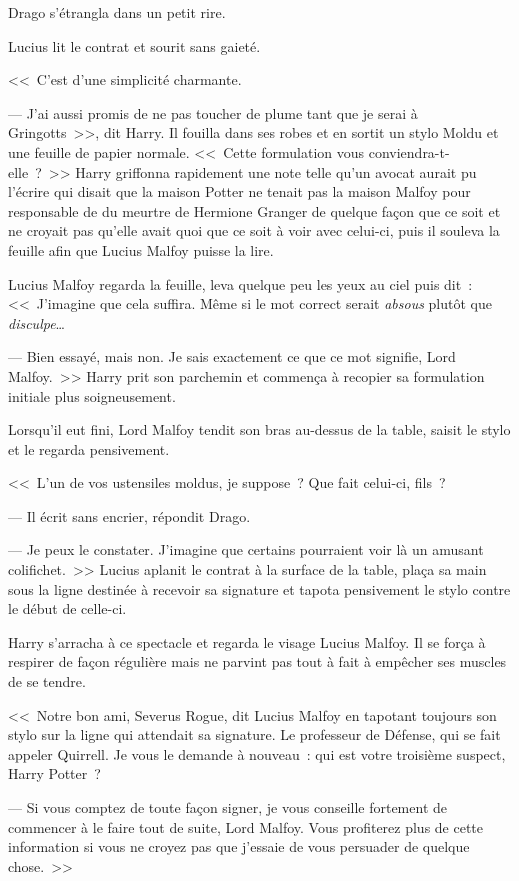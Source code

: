 Drago s'étrangla dans un petit rire.

Lucius lit le contrat et sourit sans gaieté.

<<~C'est d'une simplicité charmante.

--- J'ai aussi promis de ne pas toucher de plume tant que je serai à Gringotts~>>, dit Harry. Il fouilla dans ses robes et en sortit un stylo Moldu et une feuille de papier normale. <<~Cette formulation vous conviendra-t-elle~?~>> Harry griffonna rapidement une note telle qu'un avocat aurait pu l'écrire qui disait que la maison Potter ne tenait pas la maison Malfoy pour responsable de du meurtre de Hermione Granger de quelque façon que ce soit et ne croyait pas qu'elle avait quoi que ce soit à voir avec celui-ci, puis il souleva la feuille afin que Lucius Malfoy puisse la lire.

Lucius Malfoy regarda la feuille, leva quelque peu les yeux au ciel puis dit~:
<<~J'imagine que cela suffira. Même si le mot correct serait \emph{absous} plutôt que \emph{disculpe}…

--- Bien essayé, mais non. Je sais exactement ce que ce mot signifie, Lord Malfoy.~>> Harry prit son parchemin et commença à recopier sa formulation initiale plus soigneusement.

Lorsqu'il eut fini, Lord Malfoy tendit son bras au-dessus de la table, saisit le stylo et le regarda pensivement.

<<~L'un de vos ustensiles moldus, je suppose~? Que fait celui-ci, fils~?

--- Il écrit sans encrier, répondit Drago.

--- Je peux le constater. J'imagine que certains pourraient voir là un amusant colifichet.~>> Lucius aplanit le contrat à la surface de la table, plaça sa main sous la ligne destinée à recevoir sa signature et tapota pensivement le stylo contre le début de celle-ci.

Harry s'arracha à ce spectacle et regarda le visage Lucius Malfoy. Il se força à respirer de façon régulière mais ne parvint pas tout à fait à empêcher ses muscles de se tendre.

<<~Notre bon ami, Severus Rogue, dit Lucius Malfoy en tapotant toujours son stylo sur la ligne qui attendait sa signature. Le professeur de Défense, qui se fait appeler Quirrell. Je vous le demande à nouveau~: qui est votre troisième suspect, Harry Potter~?

--- Si vous comptez de toute façon signer, je vous conseille fortement de commencer à le faire tout de suite, Lord Malfoy. Vous profiterez plus de cette information si vous ne croyez pas que j'essaie de vous persuader de quelque chose.~>>

